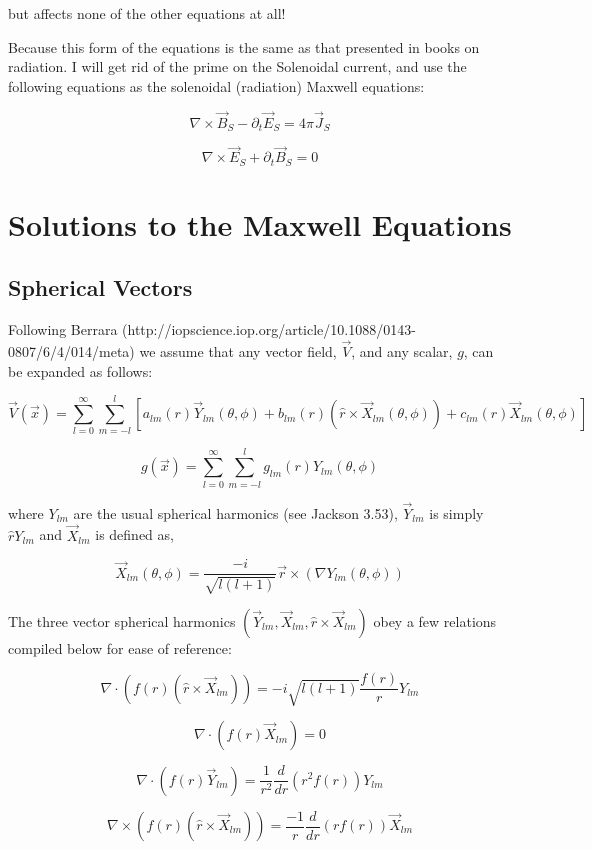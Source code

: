 \documentclass {article}
\begin{document}
but affects none of the other equations at all!

Because this form of the equations is the same as that presented in books on radiation. I will get rid of the prime on the Solenoidal current, and use the following equations as the solenoidal (radiation) Maxwell equations:

$$\nabla \times \vec B_S - \partial_t \vec E_S =  4 \pi \vec J_S$$

$$\nabla \times \vec E_S + \partial_t \vec B_S = 0 $$
\newpage

\section{Solutions to the Maxwell Equations}
\subsection{Spherical Vectors}
Following Berrara (http://iopscience.iop.org/article/10.1088/0143-0807/6/4/014/meta) we assume that any vector field, $\vec V$, and any scalar, $g$, can be expanded as follows:

$$\vec V (\vec x) = \sum_{l=0}^{\infty} \sum_{m=-l}^{l} \left[a_{lm}(r) \vec Y_{lm}(\theta, \phi) +b_{lm}(r) \left( \hat r \times \vec X_{lm} (\theta, \phi) \right) +c_{lm}(r) \vec X_{lm} (\theta, \phi) \right] $$

$$g(\vec x) = \sum_{l=0}^{\infty} \sum_{m=-l}^{l} g_{lm}(r) Y_{lm}(\theta, \phi)$$

where $Y_{lm}$ are the usual spherical harmonics (see Jackson 3.53), $\vec Y_{lm}$ is simply $\hat r Y_{lm}$  and $\vec X_{lm}$ is defined as,

$$\vec X_{lm}(\theta, \phi) = \frac {-i}{\sqrt{l(l+1)}} \vec r \times \left( \nabla Y_{lm}(\theta, \phi) \right) $$

The three vector spherical harmonics $(\vec Y_{lm}, \vec X_{lm}, \hat r \times \vec X_{lm} )$ obey a few relations compiled below for ease of reference:

$$\nabla  \cdot \left( f(r) \left( \hat r \times \vec X_{lm} \right) \right) = - i \sqrt {l(l+1)} \frac {f(r)} {r} Y_{lm}$$

$$\nabla \cdot \left( f(r) \vec X_{lm} \right) = 0 $$

$$ \nabla \cdot \left( f(r) \vec Y_{lm} \right) = \frac {1}{r^2} \frac d {dr} \left(r^2 f(r) \right) Y_{lm}$$

$$\nabla \times \left( f(r) \left( \hat r \times \vec X_{lm} \right) \right) = \frac {-1} {r} \frac d {dr} \left( r f(r) \right) \vec X_{lm}$$
\end{document}
